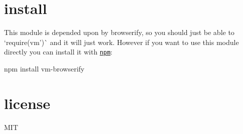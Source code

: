 \section*{install}

This module is depended upon by browserify, so you should just be able to `require(\textquotesingle{}vm')\`{} and it will just work. However if you want to use this module directly you can install it with \href{http://npmjs.org}{\tt npm}\+:


\begin{DoxyCode}
npm install vm-browserify
\end{DoxyCode}


\section*{license}

M\+IT 